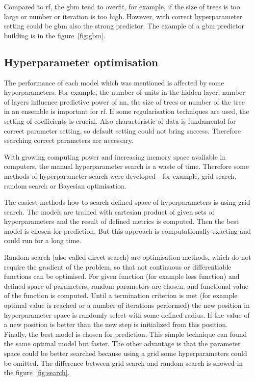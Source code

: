 \documentclass[thesis=M,english]{FITthesis}[2012/10/20]
\begin{document}
Compared to \gls{rf}, the \gls{gbm} tend to overfit, for example, if the size of trees is too large or number or iteration is too high. However, with correct hyperparameter setting could be \gls{gbm} also the strong predictor. The example of a \gls{gbm} predictor building is in the figure~\ref{fig:gbm}.

\subsection{Hyperparameter optimisation}

The performance of each model which was mentioned is affected by some hyperparameters. For example, the number of units in the hidden layer, number of layers influence predictive power of \gls{nn}, the size of trees or number of the tree in an ensemble is important for \gls{rf}. If some regularisation techniques are used, the setting of coefficients is crucial. Also characteristic of data is fundamental for correct parameter setting, so default setting could not bring success. Therefore searching correct parameters are necessary.

With growing computing power and increasing memory space available in computers, the manual hyperparameter search is a waste of time. Therefore some methods of hyperparameter search were developed - for example, grid search, random search or Bayesian optimisation.

The easiest methods how to search defined space of hyperparameters is using grid search. The models are trained with cartesian product of given sets of hyperparameters and the result of defined metrics is computed. Then the best model is chosen for prediction. But this approach is computationally exacting and could run for a long time.

Random search (also called direct-search) are optimisation methods, which do not require the gradient of the problem, so that not continuous or differentiable functions can be optimised.\cite{Bergstra2012rs} For given function (for example loss function) and defined space of parameters, random parameters are chosen, and functional value of the function is computed. Until a termination criterion is met (for example optimal value is reached or a number of iterations performed) the new position in hyperparameter space is randomly select with some defined radius. If the value of a new position is better than the new step is initialized from this position. Finally, the best model is chosen for prediction. This simple technique can found the same optimal model but faster. The other advantage is that the parameter space could be better searched because using a grid some hyperparameters could be omitted. The difference between grid search and random search is showed in the figure~\ref{fig:search}.
\end{document}
